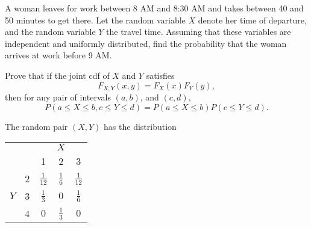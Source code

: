 \documentclass[12pt,letterpaper]{exam}
\begin{document}
\begin{questions}
	
	\begin{solution}
		
	\end{solution}

	\setcounter{question}{6}
	\question 
	A woman leaves for work between 8 AM and 8:30 AM and takes between 40 and 50 
	minutes to get there. Let the random variable \(X\) denote her time of departure, and
	the random variable \(Y\) the travel time. Assuming that these variables are independent
	and uniformly distributed, find the probability that the woman arrives at work before
	9 AM.
	
	\begin{solution}
		
	\end{solution}

	\setcounter{question}{8}
	\question 
	Prove that if the joint cdf of \(X\) and \(Y\) satisfies
		\[F_{X,Y} (x,y) = F_X(x)F_Y(y),\]
	then for any pair of intervals \((a, b)\), and \((c, d)\),
		\[P(a \leq X \leq b, c \leq Y \leq d) = P(a \leq X \leq b)P(c \leq Y \leq d).\]
	
	\begin{solution}
		
	\end{solution}

	\question 
	The random pair \((X,Y)\) has the distribution
	
	\begin{center}
		\def\arraystretch{1.25}
		\begin{tabular}{cc|ccc}
			& & & \(X\) & \\
			& & 1 & 2 & 3 \\
			\hline
			& 2 & \(\frac{1}{12}\) & \(\frac{1}{6}\) & \(\frac{1}{12}\) \\
			\(Y\) & 3 & \(\frac{1}{3}\)  & \(0\) & \(\frac{1}{6}\) \\
			& 4 & \(0\) & \(\frac{1}{3}\) &  \(0\)
		\end{tabular}
	\end{center}
	

\end{questions}
\end{document}
